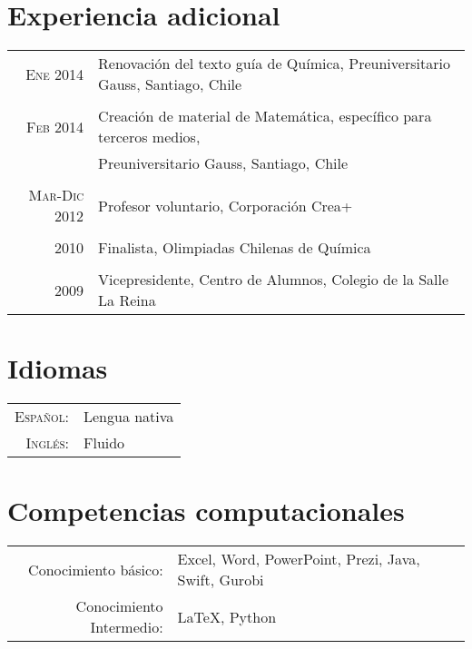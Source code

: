 \documentclass[a4paper,10pt]{article}
\begin{document}
\section{Experiencia adicional}
\begin{tabular}{rl}
\textsc{Ene 2014} 
	&	Renovación del texto guía de Química, Preuniversitario Gauss, Santiago, Chile 	\\
	&	\\
	
\textsc{Feb 2014} 
	&	Creación de material de Matemática, específico para terceros medios,	\\
	&	Preuniversitario Gauss, Santiago, Chile 	\\
	&	\\
	
\textsc{Mar-Dic 2012}
	&	Profesor voluntario, Corporación Crea+	\\
	&	\\

\textsc{2010}
	&	Finalista, Olimpiadas Chilenas de Química	\\
	&	\\
	
\textsc{2009}
	&	Vicepresidente, Centro de Alumnos, Colegio de la Salle La Reina

\end{tabular}

\section{Idiomas}
\begin{tabular}{rl}
 \textsc{Español:}
 	&	Lengua nativa	\\

\textsc{Inglés:}
	&	Fluido	\\

\end{tabular}

\section{Competencias computacionales}
\begin{tabular}{rl}
Conocimiento básico:
	& Excel, Word, PowerPoint, Prezi, Java, Swift, Gurobi 	\\

Conocimiento Intermedio:
	& {\fb \LaTeX}, Python	\\
\end{tabular}
\end{document}
